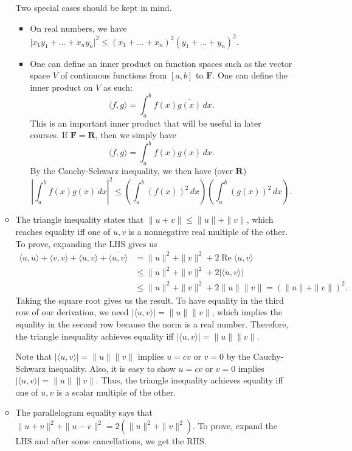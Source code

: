 \documentclass[11pt]{article}
\newcommand{\R}{\mathbf{R}}
\newcommand{\F}{\mathbf{F}}
\renewcommand{\Re}{\operatorname{Re}}
\newcommand{\conj}[1]{\overline{#1}}
\newcommand{\inp}[2]{\langle #1, #2 \rangle}
\newcommand{\nm}[1]{\|#1\|}
\newcommand{\abs}[1]{\lvert #1 \rvert}
\newcommand{\dx}{\,dx}
\begin{document}
\begin{itemize}
\begin{itemize}
        Two special cases should be kept in mind.
        \begin{itemize}
            \item On real numbers, we have $\abs{x_1y_1+\dots+x_ny_n}^2 \leq (x_1+\dots+x_n)^2(y_1+\dots+y_n)^2$.
            \item One can define an inner product on function spaces such as the vector space $V$ of continuous functions from $[a,b]$ to $\F$. One can define the inner product on $V$ as such: $$\inp{f}{g} = \int_a^b f(x)\conj{g(x)} \dx.$$ This is an important inner product that will be useful in later courses. If $\F = \R$, then we simply have $$\inp{f}{g} = \int_a^b f(x)g(x) \dx.$$ By the Cauchy-Schwarz inequality, we then have (over $\R$) \[\left\lvert\int_a^b f(x)g(x) \dx\right\rvert ^2 \leq \left(\int_a^b (f(x))^2 \dx \right) \left(\int_a^b (g(x))^2 \dx \right).\]
        \end{itemize}
        \item The triangle inequality states that $\|u+v\| \leq \|u\|+\|v\|$, which reaches equality iff one of $u,v$ is a nonnegative real multiple of the other.
        To prove, expanding the LHS gives us
        \begin{align*}
            \inp{u}{u}+\inp{v}{v}+\inp{u}{v}+\conj{\inp{u}{v}} & = \nm{u}^2+\nm{v}^2+2 \Re{\inp{u}{v}} \\ & \leq \nm{u}^2+\nm{v}^2+2\abs{\inp{u}{v}} \\ & \leq \nm{u}^2+\nm{v}^2+2\nm{u}\nm{v} = (\nm{u}+\nm{v})^2.
        \end{align*}
        Taking the square root gives us the result. To have equality in the third row of our derivation, we need $\abs{\inp{u}{v}} = \nm{u}\nm{v}$, which implies the equality in the second row because the norm is a real number. Therefore, the triangle inequality achieves equality iff $\abs{\inp{u}{v}} = \nm{u}\nm{v}$.
        
        Note that $\abs{\inp{u}{v}} = \nm{u}\nm{v}$ implies $u=cv$ or $v=0$ by the Cauchy-Schwarz inequality. Also, it is easy to show $u=cv$ or $v=0$ implies $\abs{\inp{u}{v}} = \nm{u}\nm{v}$. Thus, the triangle inequality achieves equality iff one of $u,v$ is a scalar multiple of the other.
        \item The parallelogram equality says that $\|u+v\|^2+\|u-v\|^2 = 2(\|u\|^2+ \|v\|^2)$. To prove, expand the LHS and after some cancellations, we get the RHS.
    \end{itemize}
\end{itemize}
\end{document}
